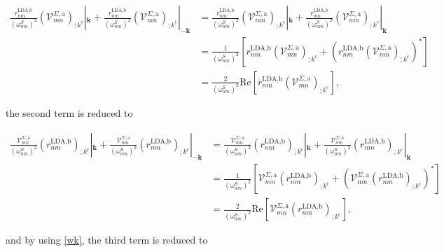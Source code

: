 \documentclass[10pt]{article}
\begin{document}
\begin{align}\label{first_term_gen_deriv}
\frac{r^{\text{LDA,b}}_{nm}}{(\omega^{S}_{nm})^{2}}\left(\mathcal{V}^{\Sigma,\text{a}}_{mn}\right)_{;k^{\text{c}}}|_{\mathbf{k}} + \frac{r^{\text{LDA,b}}_{nm}}{(\omega^{S}_{nm})^{2}}\left(\mathcal{V}^{\Sigma,\text{a}}_{mn}\right)_{;k^{\text{c}}}|_{-\mathbf{k}}
&= \frac{r^{\text{LDA,b}}_{nm}}{(\omega^{S}_{nm})^{2}}\left(\mathcal{V}^{\Sigma,\text{a}}_{mn}\right)_{;k^{\text{c}}}|_{\mathbf{k}} + \frac{r^{\text{LDA,b}}_{mn}}{(\omega^{S}_{nm})^{2}}\left(\mathcal{V}^{\Sigma,\text{a}}_{nm}\right)_{;k^{\text{c}}}|_{\mathbf{k}}\nonumber\\
&= \frac{1}{(\omega^{S}_{nm})^{2}}\left[r^{\text{LDA,b}}_{nm}\left(\mathcal{V}^{\Sigma,\text{a}}_{mn}\right)_{;k^{\text{c}}} + \left(r^{\text{LDA,b}}_{nm}\left(\mathcal{V}^{\Sigma,\text{a}}_{mn}\right)_{;k^{\text{c}}}\right)^*\right]\nonumber\\
&= \frac{2}{(\omega^{S}_{nm})^{2}}\mathrm{Re}\left[r^{\text{LDA,b}}_{nm}\left(\mathcal{V}^{\Sigma,\text{a}}_{mn}\right)_{;k^{\text{c}}}\right],
\end{align}

the second term is reduced to

\begin{align}\label{second_term_gen_deriv}
\frac{\mathcal{V}^{\Sigma,\text{a}}_{mn}}{(\omega^{S}_{nm})^{2}}\left(r^{\text{LDA,b}}_{nm}\right)_{;k^{\text{c}}}|_{\mathbf{k}} + \frac{\mathcal{V}^{\Sigma,\text{a}}_{mn}}{(\omega^{S}_{nm})^{2}}\left(r^{\text{LDA,b}}_{nm}\right)_{;k^{\text{c}}}|_{-\mathbf{k}}
&= \frac{\mathcal{V}^{\Sigma,\text{a}}_{mn}}{(\omega^{S}_{nm})^{2}}\left(r^{\text{LDA,b}}_{nm}\right)_{;k^{\text{c}}}|_{\mathbf{k}} + \frac{\mathcal{V}^{\Sigma,\text{a}}_{nm}}{(\omega^{S}_{nm})^{2}}\left(r^{\text{LDA,b}}_{mn}\right)_{;k^{\text{c}}}|_{\mathbf{k}}\nonumber\\
&= \frac{1}{(\omega^{S}_{nm})^{2}}\left[\mathcal{V}^{\Sigma,\text{a}}_{mn}\left(r^{\text{LDA,b}}_{nm}\right)_{;k^{\text{c}}} + \left(\mathcal{V}^{\Sigma,\text{a}}_{mn}\left(r^{\text{LDA,b}}_{nm}\right)_{;k^{\text{c}}}\right)^*\right]\nonumber\\
&= \frac{2}{(\omega^{S}_{nm})^{2}}\mathrm{Re}\left[\mathcal{V}^{\Sigma,\text{a}}_{mn}\left(r^{\text{LDA,b}}_{nm}\right)_{;k^{\text{c}}}\right],
\end{align}

and by using \eqref{wk}, the third term is reduced to
\end{document}
